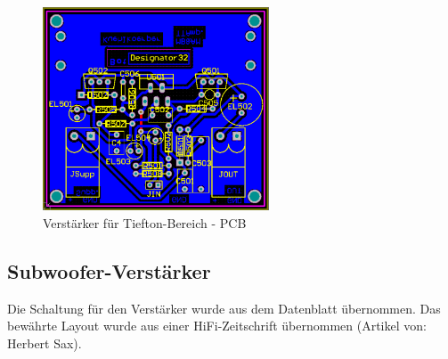 \begin{figure} [H]
	\centering	
	\includegraphics[width=0.6\textwidth]{img/Print5/5_TTVerstaerker-PCB.PNG}
	\caption{Verstärker für Tiefton-Bereich - PCB}
	\label {fig:4.4.3.1}
\end{figure}


\newpage
\subsection{Subwoofer-Verstärker}
Die Schaltung für den Verstärker wurde aus dem Datenblatt übernommen. %
Das bewährte Layout wurde aus einer HiFi-Zeitschrift übernommen (Artikel von: Herbert Sax).
